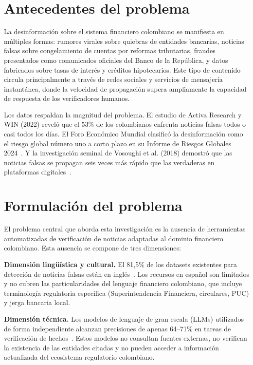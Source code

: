 \section{Antecedentes del problema}

La desinformación sobre el sistema financiero colombiano se manifiesta en múltiples formas: rumores virales sobre quiebras de entidades bancarias, noticias falsas sobre congelamiento de cuentas por reformas tributarias, fraudes presentados como comunicados oficiales del Banco de la República, y datos fabricados sobre tasas de interés y créditos hipotecarios. Este tipo de contenido circula principalmente a través de redes sociales y servicios de mensajería instantánea, donde la velocidad de propagación supera ampliamente la capacidad de respuesta de los verificadores humanos.

Los datos respaldan la magnitud del problema. El estudio de Activa Research y WIN (2022) reveló que el 53\% de los colombianos enfrenta noticias falsas todos o casi todos los días. El Foro Económico Mundial clasificó la desinformación como el riesgo global número uno a corto plazo en su Informe de Riesgos Globales 2024~\cite{WEF2024}. Y la investigación seminal de Vosoughi et al. (2018) demostró que las noticias falsas se propagan seis veces más rápido que las verdaderas en plataformas digitales~\cite{Vosoughi2018}.

\section{Formulación del problema}

El problema central que aborda esta investigación es la ausencia de herramientas automatizadas de verificación de noticias adaptadas al dominio financiero colombiano. Esta ausencia se compone de tres dimensiones:

\textbf{Dimensión lingüística y cultural.} El 81,5\% de los datasets existentes para detección de noticias falsas están en inglés~\cite{Oshikawa2020}. Los recursos en español son limitados y no cubren las particularidades del lenguaje financiero colombiano, que incluye terminología regulatoria específica (Superintendencia Financiera, circulares, PUC) y jerga bancaria local.

\textbf{Dimensión técnica.} Los modelos de lenguaje de gran escala (LLMs) utilizados de forma independiente alcanzan precisiones de apenas 64--71\% en tareas de verificación de hechos~\cite{Hoes2023}. Estos modelos no consultan fuentes externas, no verifican la existencia de las entidades citadas y no pueden acceder a información actualizada del ecosistema regulatorio colombiano.

